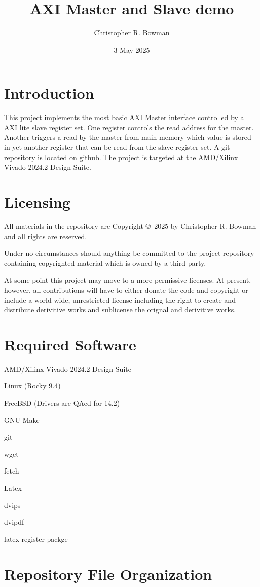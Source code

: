 \documentclass{report}
\title{AXI Master and Slave demo}
\author{Christopher R. Bowman}
\date{3 May 2025}
\begin{document}
\maketitle
\tableofcontents
\listoffigures
\listoftables
\pagebreak
\pagestyle{headings}
\chapter{Introduction}
This project implements the most basic AXI Master interface controlled by a
AXI lite slave register set.  One register controls the read address for the
master.  Another triggers a read by the master from main memory which value
is stored in yet another register that can be read from the slave register
set.
A git repository is located on
\href{https://github.com/}
{github}.
The project is targeted at the AMD/Xilinx Vivado 2024.2 Design Suite.

\chapter{Licensing}
All materials in the repository are Copyright \copyright\ 2025 by
Christopher R. Bowman and all rights are reserved.

Under no circumstances should anything be committed to the
project repository containing copyrighted material which is
owned by a third party.

At some point this project may move to a more permissive licenses.
At present, however, all contributions will have to either donate
the code and copyright or include a world wide, unrestricted
license including the right to create and distribute derivitive
works and sublicense the orignal and derivitive works.

\chapter{Required Software}
AMD/Xilinx Vivado 2024.2 Design Suite

Linux (Rocky 9.4)

FreeBSD (Drivers are QAed for 14.2)

GNU Make

git

wget

fetch

Latex

dvips

dvipdf

latex register packge

\chapter{Repository File Organization}
\end{document}
